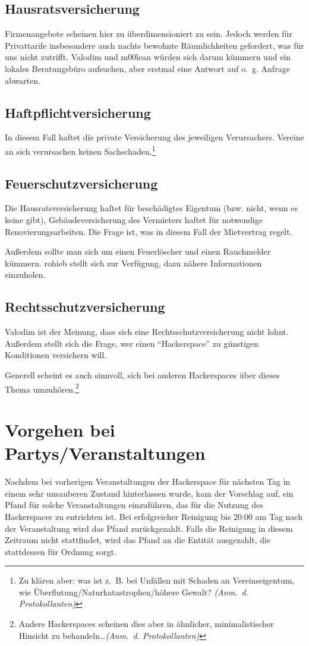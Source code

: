 \documentclass[a4paper,12pt]{scrartcl}
\begin{document}
\subsection{Hausratsversicherung}
Firmenangebote scheinen hier zu überdimensioniert zu sein. Jedoch werden für
Privattarife insbesondere auch nachts bewohnte Räumlichkeiten gefordert, was für
uns nicht zutrifft. Valodim und m00lean würden sich darum kümmern und ein
lokales Beratungsbüro aufsuchen, aber erstmal eine Antwort auf o.~g. Anfrage
abwarten.

\subsection{Haftpflichtversicherung}
In diesem Fall haftet die private Versicherung des jeweiligen Verursachers.
Vereine an sich verursachen keinen Sachschaden.\footnote{Zu klären aber:
was ist z.~B. bei Unfällen mit Schaden an Vereinseigentum, wie
Überflutung/Natur\-katastrophen/höhere Gewalt?
\emph{(Anm.~d. Protokollanten)}}

\subsection{Feuerschutzversicherung}
Die Hausratsversicherung haftet für beschädigtes Eigentum (bzw. nicht, wenn es
keine gibt), Gebäudeversicherung des Vermieters haftet für notwendige
Renovierungsarbeiten. Die Frage ist, was in diesem Fall der Mietvertrag regelt.

Außerdem sollte man sich um einen Feuerlöscher und einen Rauchmelder kümmern.
rohieb stellt sich zur Verfügung, dazu nähere Informationen einzuholen.

\subsection{Rechtsschutzversicherung}
Valodim ist der Meinung, dass sich eine Rechtsschutzversicherung nicht lohnt.
Außerdem stellt sich die Frage, wer einen "`Hackerspace"' zu günstigen
Konditionen versichern will.

Generell scheint es auch sinnvoll, sich bei anderen Hackerspaces über dieses
Thema umzuhören.\footnote{Andere Hackerspaces scheinen dies aber in ähnlicher,
minimalistischer Hinsicht zu behandeln\ldots \emph{(Anm.~d. Protokollanten)}}

\section{Vorgehen bei Partys/Veranstaltungen}
Nachdem bei vorherigen Veranstaltungen der Hackerspace für nächsten Tag in einem
sehr unsauberen Zustand hinterlassen wurde, kam der Vorschlag auf, ein Pfand für
solche Veranstaltungen einzuführen, das für die Nutzung des Hackerspaces zu
entrichten ist. Bei erfolgreicher Reinigung bis 20:00 am Tag nach der
Veranstaltung wird das Pfand zurückgezahlt. Falls die Reinigung in diesem
Zeitraum nicht stattfindet, wird das Pfand an die Entität ausgezahlt, die
stattdessen für Ordnung sorgt.
\end{document}
